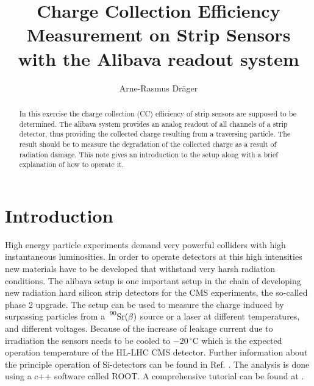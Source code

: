 \documentclass{article}
\begin{document}
\title{Charge Collection Efficiency Measurement on Strip Sensors with the Alibava readout system}
\author{Arne-Rasmus Dr\"ager}

\maketitle

\begin{abstract}
In this exercise the charge collection (CC) efficiency of strip sensors are supposed to be determined. The alibava system provides an analog readout of all channels of a strip detector, thus providing the collected charge resulting from a traversing particle. The result should be to measure the degradation of the collected charge as a result of radiation damage. This note gives an introduction to the setup along with a brief explanation of how to operate it.
\end{abstract}



\section{Introduction}

High energy particle experiments demand very powerful colliders with high instantaneous luminosities. In order to operate detectors at this high intensities new materials have to be developed that withstand very harsh radiation conditions. The alibava setup is one important setup in the chain of developing new radiation hard silicon strip detectors for the CMS experiments, the so-called phase 2 upgrade. The setup can be used to measure the charge induced by surpassing particles from a $\sideset{^{90}}{}{\mathop{\mathrm{Sr}(\beta)}}$ source or a laser at different temperatures, and different voltages. Because of the increase of leakage current due to irradiation the sensors needs to be cooled to $ -20\,^{\circ}\mathrm{C} $ which is the expected operation temperature of the HL-LHC CMS detector. Further information about the principle operation of Si-detectors can be found in Ref. \cite{Silicon_Microstrip_dectectors_anna_peisert}\cite{Alibava}. The analysis is done using a c++ software called ROOT. A comprehensive tutorial can be found at \cite{ROOT_Tutorial}.
\end{document}
